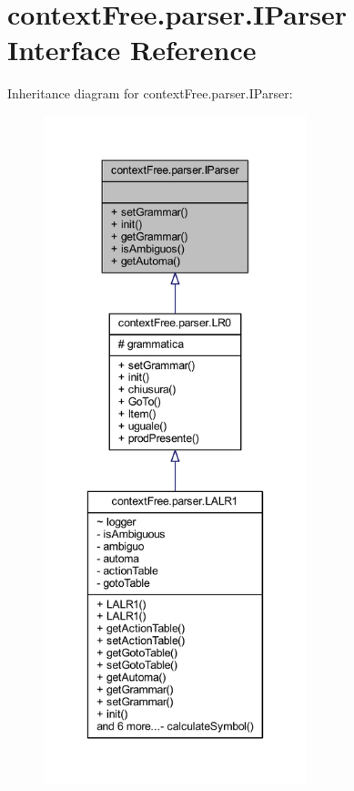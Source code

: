 \hypertarget{interfacecontext_free_1_1parser_1_1_i_parser}{\section{context\-Free.\-parser.\-I\-Parser Interface Reference}
\label{interfacecontext_free_1_1parser_1_1_i_parser}
}


Inheritance diagram for context\-Free.\-parser.\-I\-Parser\-:\nopagebreak
\begin{figure}[H]
\begin{center}
\leavevmode
\includegraphics[height=550pt]{interfacecontext_free_1_1parser_1_1_i_parser__inherit__graph}
\end{center}
\end{figure}
